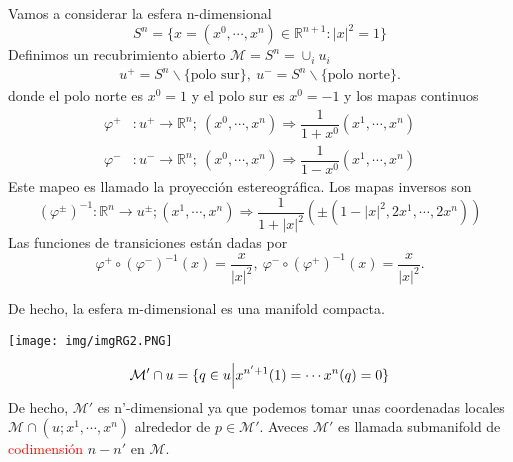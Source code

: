 \documentclass[../main]{subfiles}
\begin{document}
Vamos a considerar la esfera n-dimensional
\begin{equation}
    S^n=\{x=(x^0, \cdots, x^n) \in \mathbb{R}^{n+1}: |x|^2=1\}
\end{equation}
Definimos un recubrimiento abierto $\mathcal{M}=S^n=\cup_i u_i$
\begin{align}
    u^{+}=S^n \backslash \{ \text{polo sur}\}, \ u^{-}=S^n \backslash \{ \text{polo norte}\}.
\end{align}
donde el polo norte es $x^0=1$ y el polo sur es $x^0=-1$ y los mapas continuos
\begin{equation}
    \begin{split}
        \varphi^+&: u^+\rightarrow \mathbb{R}^n; \ (x^0, \cdots, x^n) \Rightarrow \dfrac{1}{1+x^0}(x^1, \cdots, x^n)\\
        \varphi^-&: u^-\rightarrow \mathbb{R}^n; \ (x^0, \cdots, x^n) \Rightarrow \dfrac{1}{1-x^0}(x^1, \cdots, x^n)
    \end{split}
\end{equation}
Este mapeo es llamado la proyección estereográfica. Los mapas inversos son
\begin{equation}
    (\varphi^{\pm})^{-1}: \mathbb{R}^n \rightarrow u^{\pm}; (x^1, \cdots, x^n) \Rightarrow \dfrac{1}{1+|x|^2}(\pm(1-|x|^2, 2x^1, \cdots, 2x^n))
\end{equation}
Las funciones de transiciones están dadas por
\begin{equation}
    \varphi^+ \circ (\varphi^-)^{-1}(x)=\dfrac{x}{|x|^2}, \ \varphi^- \circ (\varphi^+)^{-1}(x)=\dfrac{x}{|x|^2}.
\end{equation}

De hecho, la esfera m-dimensional es una manifold compacta.
\begin{center}
    \texttt{[image: img/imgRG2.PNG]}
\end{center}

\begin{equation}
    \mathcal{M}' \cap u=\{ q\in u \Big{|} x^{n'+1}(1)=\cdots x^n(q)=0\}
\end{equation}
De hecho, $\mathcal{M}'$ es n'-dimensional ya que podemos tomar unas coordenadas locales $\mathcal{M}\cap (u; x^1, \cdots, x^n)$ alrededor de $p\in \mathcal{M}'$. Aveces $\mathcal{M}'$ es llamada submanifold de \textcolor{red}{codimensión} $n-n'$ en $\mathcal{M}$. 
\end{document}
